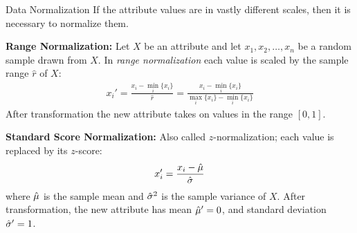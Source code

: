 \begin{frame}{Data Normalization}
  If the attribute values are in vastly different scales, then it is
necessary to
normalize them.

\medskip
{\bf Range Normalization:}
Let $X$ be an attribute and let $x_1, x_2, \dots, x_n$ be a random
sample drawn from $X$.
In {\em range normalization} each value is scaled by the sample range
$\hat{r}$ of $X$:
\begin{align*}
    x_i' = \frac{x_i - \min_i\{x_i\}}{\hat{r}} =
    \frac{x_i - \min_i \{x_i\}}{\max_i\{x_i\} - \min_i\{x_i\}}
\end{align*}
After transformation the new attribute takes on values in the
range $[0,1]$.

\medskip
{\bf Standard Score Normalization: }
Also called $z$-normalization;
each value is replaced by its $z$-score:
\begin{equation*}
x_i' = \frac{x_i-\hat{\mu}}{\hat{\sigma}}
\end{equation*}
where $\hat{\mu}$ is the sample mean and $\hat{\sigma}^2$ is the sample
variance of $X$.
After transformation, the new attribute has mean $\hat{\mu}' = 0$,
and standard deviation $\hat{\sigma}' = 1$.
\end{frame}


